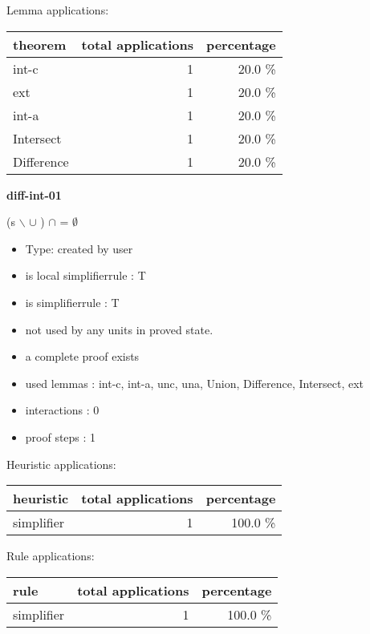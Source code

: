\documentclass[a4paper]{article}
\begin{document}
Lemma applications:

\begin{supertabular}{l|r|r}
theorem	        & total applications & percentage \\ \hline
int-c & 1 & 20.0 \% \\
ext & 1 & 20.0 \% \\
int-a & 1 & 20.0 \% \\
Intersect & 1 & 20.0 \% \\
Difference & 1 & 20.0 \% \\

\end{supertabular}
\pagebreak

{\LARGE\bf diff-int-01}\label{lemma-diff-int-01}

\medskip

 \Fol (s $\backslash$  $\cup$ ) $\cap$  = $\emptyset$

\begin{itemize}

\item Type: created by user

\item is local simplifierrule : T
\item is simplifierrule : T
\item not used by any units in proved state.
\item       a complete proof exists
\item       used lemmas  : int-c, int-a, unc, una, Union, Difference, Intersect, ext
\item       interactions : 0
\item       proof steps  : 1
\end{itemize}

\medskip


Heuristic applications:

\begin{supertabular}{l|r|r}
heuristic	& total applications & percentage \\ \hline
simplifier & 1 & 100.0 \% \\

\end{supertabular}

Rule applications:

\begin{supertabular}{l|r|r}
rule	        & total applications & percentage \\ \hline
simplifier & 1 & 100.0 \% \\

\end{supertabular}
\end{document}
